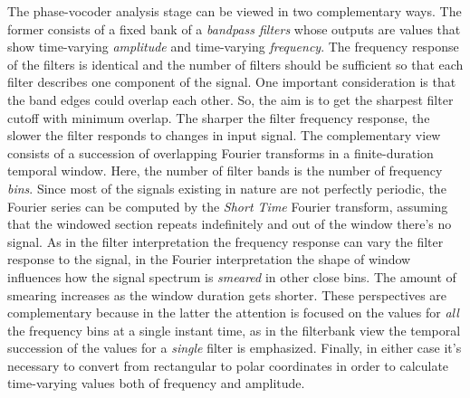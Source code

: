 The phase-vocoder analysis stage can be viewed in two complementary ways. 
The former consists of a fixed bank of a \emph{bandpass filters} whose outputs are values that show time-varying \emph{amplitude} and time-varying \emph{frequency}. The frequency response of the filters is identical and the number of filters should be sufficient so that each filter describes one component of the signal. One important consideration is that the band edges could overlap each other. So, the aim is to get the sharpest filter cutoff with minimum overlap. The sharper the filter frequency response, the slower the filter responds to changes in input signal. 
The complementary view consists of a succession of overlapping Fourier transforms in a finite-duration temporal window. Here, the number of filter bands is the number of frequency \emph{bins}. Since most of the signals existing in nature are not perfectly periodic, the Fourier series can be computed by the \emph{Short Time} Fourier transform, assuming that the windowed section repeats indefinitely and out of the window there's no signal. As in the filter interpretation the frequency response can vary the filter response to the signal, in the Fourier interpretation the shape of window influences how the signal spectrum is \emph{smeared} in other close bins. The amount of smearing increases as the window duration gets shorter. These perspectives are complementary because in the latter the attention is focused on the values for \emph{all} the frequency bins at a single instant time, as in the filterbank view the temporal succession of the values for a \emph{single} filter is emphasized. Finally, in either case it's necessary to convert from rectangular to polar coordinates in order to calculate time-varying values both of frequency and amplitude.

